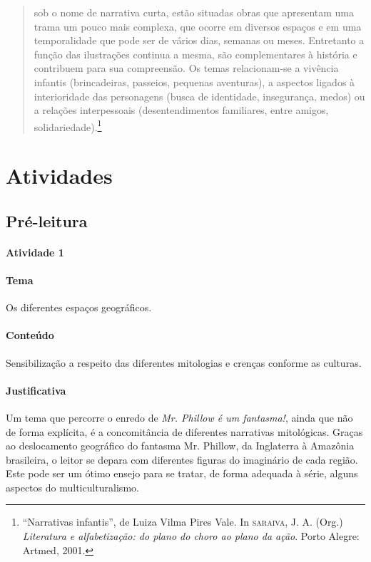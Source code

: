 \documentclass[11pt]{extarticle}
\begin{document}
\begin{quote}
sob o nome de narrativa curta, estão situadas obras que apresentam uma trama 
um pouco mais complexa, que ocorre em diversos espaços e em uma temporalidade 
que pode ser de vários dias, semanas ou meses. Entretanto a função das ilustrações 
continua a mesma, são complementares à história e contribuem para sua compreensão. 
Os temas relacionam-se a vivência infantis (brincadeiras, passeios, pequenas aventuras), 
a aspectos ligados à interioridade das personagens (busca de identidade, insegurança, 
medos) ou a relações interpessoais (desentendimentos familiares, entre amigos, solidariedade).\footnote{“Narrativas infantis”, de Luiza Vilma Pires Vale. In \textsc{saraiva}, J. A. (Org.) \textit{Literatura e alfabetização: do plano do choro ao plano da ação}. Porto Alegre: Artmed, 2001.} 
\end{quote}


\section{Atividades}

\subsection{Pré-leitura}

\paragraph{Atividade 1}


\paragraph{Tema} Os diferentes espaços geográficos.

\paragraph{Conteúdo} Sensibilização a respeito das diferentes mitologias
e crenças conforme as culturas.

\paragraph{Justificativa} Um tema que percorre o enredo de \textit{Mr. Phillow é um fantasma!},
ainda que não de forma explícita, é a concomitância de diferentes narrativas mitológicas.
Graças ao deslocamento geográfico do fantasma Mr. Phillow, da Inglaterra à Amazônia brasileira, 
o leitor se depara com diferentes figuras do imaginário de cada região. 
Este pode ser um ótimo ensejo para se tratar, de forma adequada à série,
alguns aspectos do multiculturalismo. 
\end{document}
